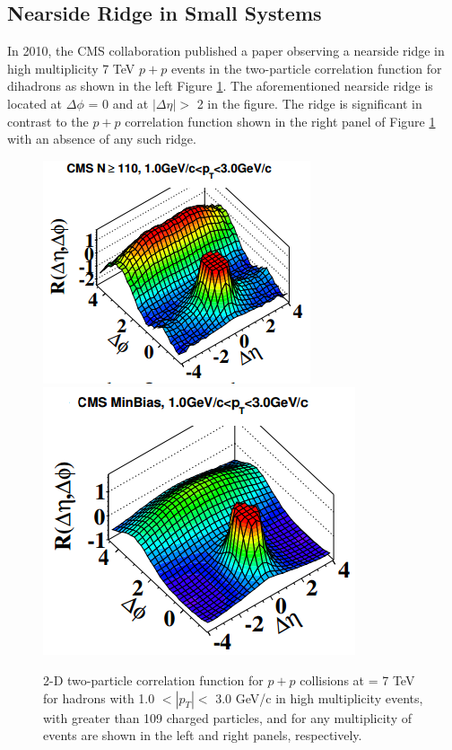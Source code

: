 \subsection{Nearside Ridge in Small Systems}
In 2010, the CMS collaboration published a paper observing a nearside ridge in high multiplicity 7 TeV $p+p$ events in the two-particle correlation function for dihadrons as shown in the left Figure \ref{fig:pp_ridge_plot}. The aforementioned nearside ridge is located at $\Delta\phi$ = 0 and at $|\Delta\eta| > $ 2 in the figure. The ridge is significant in contrast to the $p+p$ correlation function shown in the right panel of Figure \ref{fig:pp_ridge_plot} with an absence of any such ridge.
\begin{figure}[h!]
\begin{center}
\includegraphics[width=0.47\linewidth]{figs/pp_high_multiplicity_ridge.PNG}
\includegraphics[width=0.47\linewidth]{figs/pp_correlation_function_min_bias.png}
\caption{ 2-D two-particle correlation function for $p+p$ collisions at \sqsn = 7 TeV for hadrons with 1.0 $<|p_T|<$ 3.0 GeV/c in high multiplicity events, with greater than 109 charged particles, and for any multiplicity of events are shown in the left and right panels, respectively\cite{Khachatryan2010}.}
\label{fig:pp_ridge_plot}
\end{center}
\end{figure}

